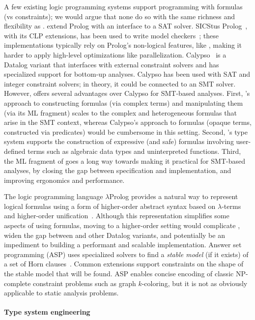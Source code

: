 \documentclass[acmsmall,screen,nonacm]{acmart}
\theoremstyle{definition}
\begin{document}
A few existing logic programming systems support programming with formulas (vs
constraints); we would argue that none do so with the same richness and
flexibility as \Name.
\citet{lpsat} extend Prolog with an interface to a SAT solver.
SICStus Prolog~\citep{sicstus}, with its CLP extensions, has been used to write model
checkers~\citep{clpmodelchecking,fribourg1996symbolic,armc,hfc}; these
implementations typically rely on Prolog's non-logical features, like
, making it harder to apply high-level optimizations like
parallelization.
Calypso~\citep{calypso,saturn} is a Datalog variant that interfaces with
external constraint solvers and has specialized support for bottom-up analyses.
Calypso has been used with SAT and integer constraint solvers; in theory, it
could be connected to an SMT solver.
However, \Name offers several advantages over Calypso for SMT-based analyses.
First, \Name's approach to constructing formulas (via complex terms) and
manipulating them (via its ML fragment) scales to the complex and
heterogeneous formulas that arise in the SMT context, whereas Calypso's
approach to formulas (opaque terms, constructed via predicates) would be
cumbersome in this setting.
Second, \Name's type system supports the construction of expressive (and safe)
formulas involving user-defined terms such as algebraic data types and
uninterpreted functions.
Third, the ML fragment of \Name goes a long way towards making it practical for
SMT-based analyses, by closing the gap between specification and
implementation, and improving ergonomics and performance.

The logic programming language $\lambda$Prolog provides a natural way to
represent logical formulas using a form of higher-order abstract syntax based
on $\lambda$-terms and higher-order unification~\citep{hoas,lambdaprolog}.
Although this representation simplifies some aspects of using formulas, moving
to a higher-order setting would complicate \Name, widen the gap between \Name
and other Datalog variants, and potentially be an impediment to building a
performant and scalable \Name implementation.
Answer set programming (ASP) uses specialized solvers to find a {\em stable
model} (if it exists) of a set of Horn clauses~\citep{stablemodel,aspsurvey}.
Common extensions support constraints on the shape of the stable model that
will be found.
ASP enables concise encoding of classic NP-complete constraint problems such as
graph $k$-coloring, but it is not as obviously applicable to static analysis
problems.

\paragraph{Type system engineering}
\end{document}
